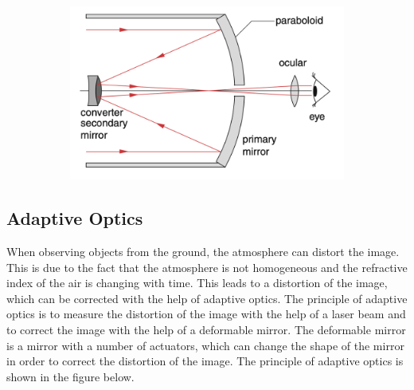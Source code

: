 \documentclass[
  a4paper,
]{book}
\begin{document}
\begin{figure}
\begin{minipage}{0.50\linewidth}
\begin{figure}[H]
{\centering \includegraphics[width=1\linewidth,height=\textheight,keepaspectratio]{geometrical-optics/img/cassegrain.png}

}


\end{figure}%

\end{minipage}%

\end{figure}%

\subsection{Adaptive Optics}\label{adaptive-optics}

When observing objects from the ground, the atmosphere can distort the
image. This is due to the fact that the atmosphere is not homogeneous
and the refractive index of the air is changing with time. This leads to
a distortion of the image, which can be corrected with the help of
adaptive optics. The principle of adaptive optics is to measure the
distortion of the image with the help of a laser beam and to correct the
image with the help of a deformable mirror. The deformable mirror is a
mirror with a number of actuators, which can change the shape of the
mirror in order to correct the distortion of the image. The principle of
adaptive optics is shown in the figure below.
\end{document}
